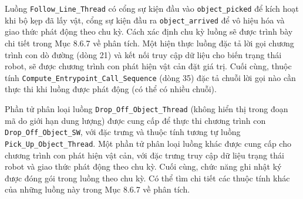 Luồng \texttt{Follow\_Line\_Thread} có cổng sự kiện đầu vào \texttt{object\_picked} để kích hoạt khi bộ kẹp đã lấy vật, cổng sự kiện đầu ra \texttt{object\_arrived} để vô hiệu hóa và giao thức phát động theo chu kỳ. Cách xác định chu kỳ luồng sẽ được trình bày chi tiết trong Mục 8.6.7 về phân tích. Một hiện thực luồng đặc tả lời gọi chương trình con dò đường (dòng 21) và kết nối truy cập dữ liệu cho biến trạng thái robot, sẽ được chương trình con phát hiện vật cản đặt giá trị. Cuối cùng, thuộc tính \texttt{Compute\_Entrypoint\_Call\_Sequence} (dòng 35) đặc tả chuỗi lời gọi nào cần thực thi khi luồng được phát động (có thể có nhiều chuỗi).

Phần tử phân loại luồng \texttt{Drop\_Off\_Object\_Thread} (không hiển thị trong đoạn mã do giới hạn dung lượng) được cung cấp để thực thi chương trình con \texttt{Drop\_Off\_Object\_SW}, với đặc trưng và thuộc tính tương tự luồng \texttt{Pick\_Up\_Object\_Thread}. Một phần tử phân loại luồng khác được cung cấp cho chương trình con phát hiện vật cản, với đặc trưng truy cập dữ liệu trạng thái robot và giao thức phát động theo chu kỳ. Cuối cùng, chức năng ghi nhật ký được đóng gói trong luồng theo chu kỳ. Có thể tìm chi tiết các thuộc tính khác của những luồng này trong Mục 8.6.7 về phân tích.

